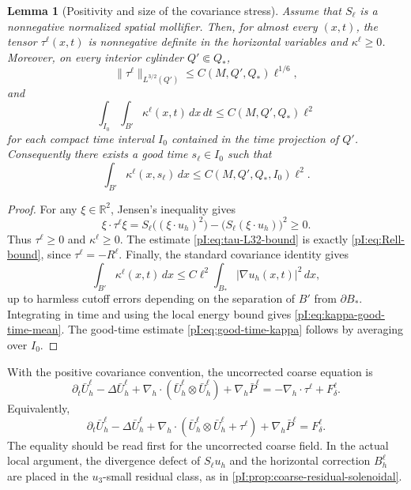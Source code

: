 \documentclass[11pt]{article}
\numberwithin{equation}{section}
\theoremstyle{plain}
\newtheorem{lemma}{Lemma}[section]
\theoremstyle{definition}
\theoremstyle{remark}
\newcommand{\R}{\mathbb R}
\newcommand{\nabh}{\nabla_h}
\newcommand{\divh}{\nabla_h\!\cdot}
\begin{document}
\begin{lemma}[Positivity and size of the covariance stress]\label{pI:lem:covariance-positive}
Assume that \(S_\ell\) is a nonnegative normalized spatial mollifier.  Then, for almost every \((x,t)\), the tensor \(\tau^\ell(x,t)\) is nonnegative definite in the horizontal variables and \(\kappa^\ell\ge0\).  Moreover, on every interior cylinder \(Q'\Subset Q_*\),
\begin{equation}\label{pI:eq:tau-L32-bound}
        \|\tau^\ell\|_{L^{3/2}(Q')}
        \le C(M,Q',Q_*)\ell^{1/6},
\end{equation}
and
\begin{equation}\label{pI:eq:kappa-good-time-mean}
        \int_{I_0}\int_{B'}\kappa^\ell(x,t)\,dx\,dt
        \le C(M,Q',Q_*)\ell^2
\end{equation}
for each compact time interval \(I_0\) contained in the time projection of \(Q'\).  Consequently there exists a good time \(s_\ell\in I_0\) such that
\begin{equation}\label{pI:eq:good-time-kappa}
        \int_{B'}\kappa^\ell(x,s_\ell)\,dx
        \le C(M,Q',Q_*,I_0)\ell^2.
\end{equation}
\end{lemma}

\begin{proof}
For any \(\xi\in\R^2\), Jensen's inequality gives
\[
        \xi\cdot\tau^\ell\xi
        =S_\ell\bigl((\xi\cdot u_h)^2\bigr)
        -\bigl(S_\ell(\xi\cdot u_h)\bigr)^2\ge0.
\]
Thus \(\tau^\ell\ge0\) and \(\kappa^\ell\ge0\).  The estimate \eqref{pI:eq:tau-L32-bound} is exactly \eqref{pI:eq:Rell-bound}, since \(\tau^\ell=-R^\ell\).  Finally, the standard covariance identity gives
\[
        \int_{B'}\kappa^\ell(x,t)\,dx
        \le C\ell^2\int_{B_*}|\nabla u_h(x,t)|^2\,dx,
\]
up to harmless cutoff errors depending on the separation of \(B'\) from \(\partial B_*\).  Integrating in time and using the local energy bound gives \eqref{pI:eq:kappa-good-time-mean}.  The good-time estimate \eqref{pI:eq:good-time-kappa} follows by averaging over \(I_0\).
\end{proof}

With the positive covariance convention, the uncorrected coarse equation is
\begin{equation}\label{pI:eq:coarse-with-positive-tau}
        \partial_t\bar U_h^\ell-
        \Delta\bar U_h^\ell
        +\divh(\bar U_h^\ell\otimes\bar U_h^\ell)
        +\nabh\bar P^\ell
        =-\divh\tau^\ell+F_\delta^\ell .
\end{equation}
Equivalently,
\[
        \partial_t\bar U_h^\ell-
        \Delta\bar U_h^\ell
        +\divh(\bar U_h^\ell\otimes\bar U_h^\ell+\tau^\ell)
        +\nabh\bar P^\ell
        =F_\delta^\ell .
\]
The equality should be read first for the uncorrected coarse field.  In the actual local argument, the divergence defect of \(S_\ell u_h\) and the horizontal correction \(B_h^\ell\) are placed in the \(u_3\)-small residual class, as in \cref{pI:prop:coarse-residual-solenoidal}.
\end{document}
